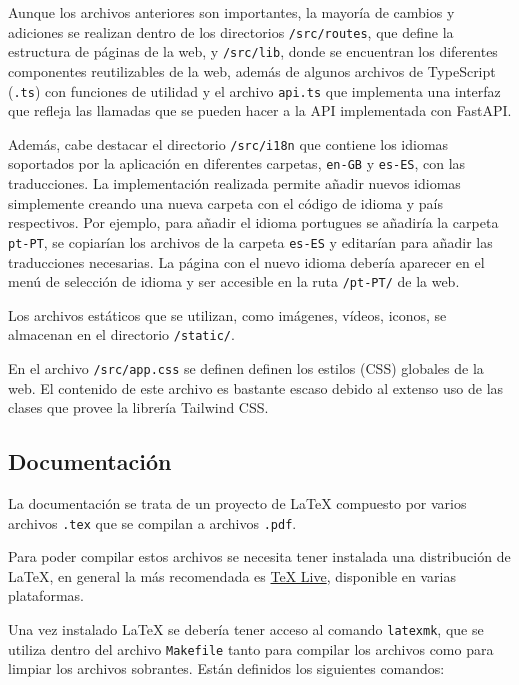 Aunque los archivos anteriores son importantes, la mayoría de cambios y
adiciones se realizan dentro de los directorios \texttt{/src/routes}, que define
la estructura de páginas de la web, y \texttt{/src/lib}, donde se encuentran los
diferentes componentes reutilizables de la web, además de algunos archivos de
TypeScript (\texttt{.ts}) con funciones de utilidad y el archivo \texttt{api.ts}
que implementa una interfaz que refleja las llamadas que se pueden hacer a la
API implementada con FastAPI.

Además, cabe destacar el directorio \texttt{/src/i18n} que contiene los idiomas
soportados por la aplicación en diferentes carpetas, \texttt{en-GB} y
\texttt{es-ES}, con las traducciones. La implementación realizada permite añadir
nuevos idiomas simplemente creando una nueva carpeta con el código de idioma y
país respectivos. Por ejemplo, para añadir el idioma portugues se añadiría la
carpeta \texttt{pt-PT}, se copiarían los archivos de la carpeta \texttt{es-ES} y
editarían para añadir las traducciones necesarias. La página con el nuevo idioma
debería aparecer en el menú de selección de idioma y ser accesible en la ruta
\texttt{/pt-PT/} de la web.

Los archivos estáticos que se utilizan, como imágenes, vídeos, iconos, se
almacenan en el directorio \texttt{/static/}.

En el archivo \texttt{/src/app.css} se definen definen los estilos (CSS)
globales de la web. El contenido de este archivo es bastante escaso debido al
extenso uso de las clases que provee la librería Tailwind CSS.

\subsection{Documentación}

La documentación se trata de un proyecto de \LaTeX{} compuesto por varios
archivos \texttt{.tex} que se compilan a archivos \texttt{.pdf}.

Para poder compilar estos archivos se necesita tener instalada una distribución
de \LaTeX{}, en general la más recomendada es
\href{https://www.tug.org/texlive/}{TeX Live}, disponible en varias plataformas.

Una vez instalado \LaTeX{} se debería tener acceso al comando \texttt{latexmk},
que se utiliza dentro del archivo \texttt{Makefile} tanto para compilar los
archivos como para limpiar los archivos sobrantes. Están definidos los
siguientes comandos:

